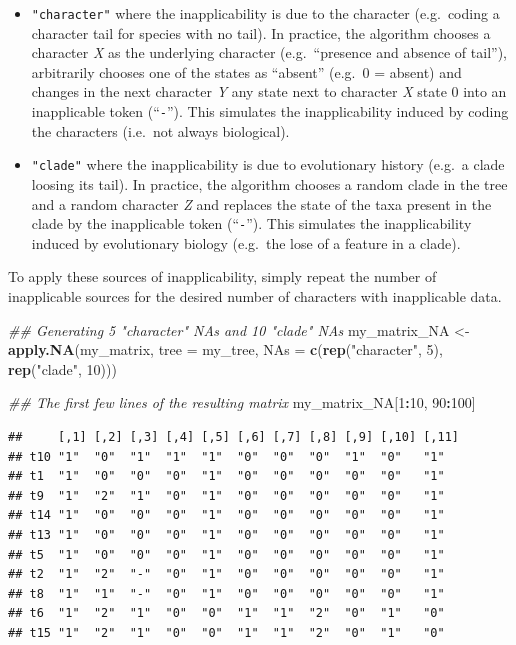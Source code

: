 \documentclass[
]{book}
\newenvironment{Shaded}{\begin{snugshade}}{\end{snugshade}}
\newcommand{\CommentTok}[1]{\textcolor[rgb]{0.56,0.35,0.01}{\textit{#1}}}
\newcommand{\DataTypeTok}[1]{\textcolor[rgb]{0.13,0.29,0.53}{#1}}
\newcommand{\DecValTok}[1]{\textcolor[rgb]{0.00,0.00,0.81}{#1}}
\newcommand{\KeywordTok}[1]{\textcolor[rgb]{0.13,0.29,0.53}{\textbf{#1}}}
\newcommand{\NormalTok}[1]{#1}
\newcommand{\OperatorTok}[1]{\textcolor[rgb]{0.81,0.36,0.00}{\textbf{#1}}}
\newcommand{\StringTok}[1]{\textcolor[rgb]{0.31,0.60,0.02}{#1}}
\providecommand{\tightlist}{%
  \setlength{\itemsep}{0pt}\setlength{\parskip}{0pt}}
\begin{document}
\begin{itemize}
\tightlist
\item
  \texttt{"character"} where the inapplicability is due to the character (e.g.~coding a character tail for species with no tail).
  In practice, the algorithm chooses a character \emph{X} as the underlying character (e.g.~``presence and absence of tail''), arbitrarily chooses one of the states as ``absent'' (e.g.~0 = absent) and changes in the next character \emph{Y} any state next to character \emph{X} state 0 into an inapplicable token (``\texttt{-}'').
  This simulates the inapplicability induced by coding the characters (i.e.~not always biological).
\item
  \texttt{"clade"} where the inapplicability is due to evolutionary history (e.g.~a clade loosing its tail).
  In practice, the algorithm chooses a random clade in the tree and a random character \emph{Z} and replaces the state of the taxa present in the clade by the inapplicable token (``\texttt{-}'').
  This simulates the inapplicability induced by evolutionary biology (e.g.~the lose of a feature in a clade).
\end{itemize}

To apply these sources of inapplicability, simply repeat the number of inapplicable sources for the desired number of characters with inapplicable data.

\begin{Shaded}
\begin{Highlighting}[]
\CommentTok{\#\# Generating 5 "character" NAs and 10 "clade" NAs}
\NormalTok{my\_matrix\_NA \textless{}{-}}\StringTok{ }\KeywordTok{apply.NA}\NormalTok{(my\_matrix, }\DataTypeTok{tree =}\NormalTok{ my\_tree,}
                         \DataTypeTok{NAs =} \KeywordTok{c}\NormalTok{(}\KeywordTok{rep}\NormalTok{(}\StringTok{"character"}\NormalTok{, }\DecValTok{5}\NormalTok{),}
                                 \KeywordTok{rep}\NormalTok{(}\StringTok{"clade"}\NormalTok{, }\DecValTok{10}\NormalTok{)))}

\CommentTok{\#\# The first few lines of the resulting matrix}
\NormalTok{my\_matrix\_NA[}\DecValTok{1}\OperatorTok{:}\DecValTok{10}\NormalTok{, }\DecValTok{90}\OperatorTok{:}\DecValTok{100}\NormalTok{]}
\end{Highlighting}
\end{Shaded}

\begin{verbatim}
##     [,1] [,2] [,3] [,4] [,5] [,6] [,7] [,8] [,9] [,10] [,11]
## t10 "1"  "0"  "1"  "1"  "1"  "0"  "0"  "0"  "1"  "0"   "1"  
## t1  "1"  "0"  "0"  "0"  "1"  "0"  "0"  "0"  "0"  "0"   "1"  
## t9  "1"  "2"  "1"  "0"  "1"  "0"  "0"  "0"  "0"  "0"   "1"  
## t14 "1"  "0"  "0"  "0"  "1"  "0"  "0"  "0"  "0"  "0"   "1"  
## t13 "1"  "0"  "0"  "0"  "1"  "0"  "0"  "0"  "0"  "0"   "1"  
## t5  "1"  "0"  "0"  "0"  "1"  "0"  "0"  "0"  "0"  "0"   "1"  
## t2  "1"  "2"  "-"  "0"  "1"  "0"  "0"  "0"  "0"  "0"   "1"  
## t8  "1"  "1"  "-"  "0"  "1"  "0"  "0"  "0"  "0"  "0"   "1"  
## t6  "1"  "2"  "1"  "0"  "0"  "1"  "1"  "2"  "0"  "1"   "0"  
## t15 "1"  "2"  "1"  "0"  "0"  "1"  "1"  "2"  "0"  "1"   "0"
\end{verbatim}
\end{document}
